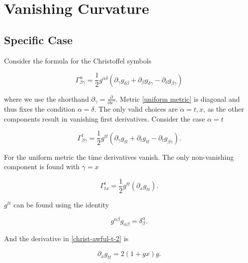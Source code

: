\documentclass[11pt]{article}
\begin{document}
\section{Vanishing Curvature}

\subsection{Specific Case}

Consider the formula for the Christoffel symbols

\begin{equation}
    \label{christ-awful-1}
    \Gamma^{\alpha}_{\beta \gamma} = \frac{1}{2} g^{\alpha \delta} \left( \partial_{\gamma} g_{\delta \beta} + \partial_{\beta} g_{\delta \gamma} - \partial_{\delta} g_{\beta \gamma}\right)
\end{equation}

where we use the shorthand $\partial_{\gamma} = \frac{\partial}{\partial x^{\gamma}}$. Metric \eqref{uniform metric} is diagonal and thus fixes the condition $\alpha = \delta$. The only valid choices are $\alpha = t, x$, as the other components result in vanishing first derivatives. Consider the case $\alpha = t$


\begin{equation}
    \label{christ-awful-t}
    \Gamma^{t}_{\beta \gamma} = \frac{1}{2} g^{t t} \left( \partial_{\gamma} g_{t t} + \partial_{t} g_{t t} - \partial_{t} g_{\beta \gamma}\right).
\end{equation}

For the uniform metric the time derivatives vanish. The only non-vanishing component is found with $\gamma = x$

\begin{equation}
    \label{christ-awful-t-2}
    \Gamma^{t}_{t x} = \frac{1}{2} g^{t t} \left( \partial_{x} g_{t t}\right).
\end{equation}

$g^{t t}$ can be found using the identity

\begin{equation}
    \label{metric-kronecker}
    g^{\alpha \beta} g_{\alpha \beta} = \delta^{\alpha} _{\beta}.
\end{equation}

And the derivative in \eqref{christ-awful-t-2} is

\begin{equation}
    \label{x-derivative-explicit}
    \partial_{x} g_{t t} = 2 (1 + gx) g.
\end{equation}
\end{document}
